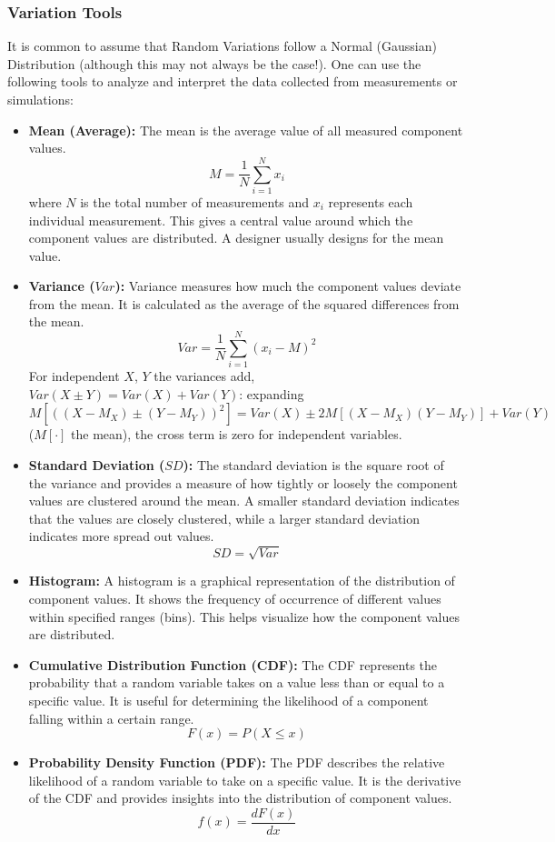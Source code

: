 \subsubsection{Variation Tools}
It is common to assume that Random Variations follow a Normal
(Gaussian) Distribution (although this may not always be the
case!). One can use the following tools to analyze and
interpret the data collected from measurements or simulations:
\begin{itemize}
  \item \textbf{Mean (Average):} The mean is the average value
    of all measured component values.\[M = \frac{1}{N} \sum_{i=1}^{N} x_i\]
    where \(N\) is the total number of measurements and \(x_i\)
    represents each individual measurement. This gives a
    central value around which the component values are
    distributed. A designer usually designs for the mean value.
  \item \textbf{Variance (\(Var\)):} Variance measures how
    much the component values deviate from the mean. It is
    calculated as the average of the squared differences from
    the mean.\[Var = \frac{1}{N} \sum_{i=1}^{N} (x_i - M)^2\]
    For independent \(X\), \(Y\) the variances add,
    \(Var(X \pm Y) = Var(X) + Var(Y)\): expanding
    \(M[((X - M_X) \pm (Y - M_Y))^2] = Var(X) \pm 2M[(X - M_X)(Y - M_Y)] + Var(Y)\) (\(M[\cdot]\) the mean), the
    cross term is zero for independent variables.
  \item \textbf{Standard Deviation (\(SD\)):} The
    standard deviation is the square root of the variance and
    provides a measure of how tightly or loosely the
    component values are clustered around the mean. A smaller
    standard deviation indicates that the values are closely
    clustered, while a larger standard deviation indicates
    more spread out values.\[SD = \sqrt{Var}\]
  \item \textbf{Histogram:} A histogram is a graphical
    representation of the distribution of component values. It
    shows the frequency of occurrence of different values
    within specified ranges (bins). This helps visualize how
    the component values are distributed.
  \item \textbf{Cumulative Distribution Function (CDF):} The CDF
    represents the probability that a random variable takes on
    a value less than or equal to a specific value. It is useful
    for determining the likelihood of a component falling within
    a certain range. \[F(x) = P(X \leq x)\]
  \item \textbf{Probability Density Function (PDF):} The PDF
    describes the relative likelihood of a random variable to
    take on a specific value. It is the derivative of the CDF and
    provides insights into the distribution of component values.
    \[f(x) = \frac{dF(x)}{dx}\]
\end{itemize}

